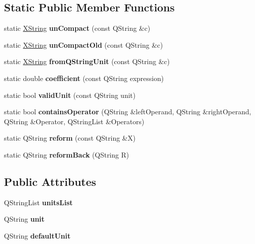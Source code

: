 \subsection*{Static Public Member Functions}
\begin{DoxyCompactItemize}
\item 
\mbox{\label{class_x_string_a1732e7151e3c7c6466acc54ba1d02fc0}} 
static \hyperlink{class_x_string}{X\+String} {\bfseries un\+Compact} (const Q\+String \&c)
\item 
\mbox{\label{class_x_string_aeee64e79458f24a9a1d417b31caaa805}} 
static \hyperlink{class_x_string}{X\+String} {\bfseries un\+Compact\+Old} (const Q\+String \&c)
\item 
\mbox{\label{class_x_string_ac80fd2b604811dc35a4f239a0524ada0}} 
static \hyperlink{class_x_string}{X\+String} {\bfseries from\+Q\+String\+Unit} (const Q\+String \&c)
\item 
\mbox{\label{class_x_string_ad6f5d630ab51d9f96a3ed1eaa989d72b}} 
static double {\bfseries coefficient} (const Q\+String expression)
\item 
\mbox{\label{class_x_string_a43b28c1ac616e85c8e71f63cf822c1fb}} 
static bool {\bfseries valid\+Unit} (const Q\+String unit)
\item 
\mbox{\label{class_x_string_a7e6824238da89c251451a7edae46abbe}} 
static bool {\bfseries contains\+Operator} (Q\+String \&left\+Operand, Q\+String \&right\+Operand, Q\+String \&Operator, Q\+String\+List \&Operators)
\item 
\mbox{\label{class_x_string_ad129139a600463a1eeb172fa540cfd20}} 
static Q\+String {\bfseries reform} (const Q\+String \&X)
\item 
\mbox{\label{class_x_string_a4f78cb4d71f07dcb74b704ee1f602e1b}} 
static Q\+String {\bfseries reform\+Back} (Q\+String R)
\end{DoxyCompactItemize}
\subsection*{Public Attributes}
\begin{DoxyCompactItemize}
\item 
\mbox{\label{class_x_string_a5a5a630ba8b13fc0fece2f1c6b7287da}} 
Q\+String\+List {\bfseries units\+List}
\item 
\mbox{\label{class_x_string_acb743d1f42847548944b333c69cccef6}} 
Q\+String {\bfseries unit}
\item 
\mbox{\label{class_x_string_a071a58b500d07d10948309a2546d51ae}} 
Q\+String {\bfseries default\+Unit}
\end{DoxyCompactItemize}


